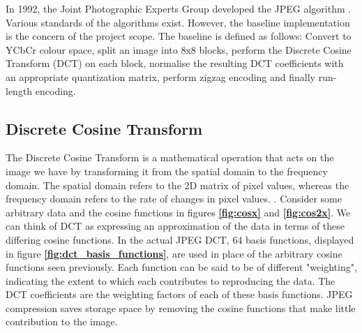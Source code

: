 \documentclass{l4proj}
\begin{document}
In 1992, the Joint Photographic Experts Group developed the JPEG algorithm \citep{lossy_data_compression:_jpeg_2021}. Various standards of the algorithms exist. However, the baseline implementation is the concern of the project scope. The baseline is defined as follows: Convert to YCbCr colour space, split an image into 8x8 blocks, perform the Discrete Cosine Transform (DCT) on each block, normalise the resulting DCT coefficients with an appropriate quantization matrix,  perform zigzag encoding and finally run-length encoding.

\subsection{Discrete Cosine Transform}

The Discrete Cosine Transform \citep{the_discrete_cosine_transform_(dct)_2021} is a mathematical operation that acts on the image we have by transforming it from the spatial domain to the frequency domain. The spatial domain refers to the 2D matrix of pixel values, whereas the frequency domain refers to the rate of changes in pixel values. \citep{spatial}. Consider some arbitrary data and the cosine functions in figures \textbf{\ref{fig:cosx}} and \textbf{\ref{fig:cos2x}}. We can think of DCT as expressing an approximation of the data in terms of these differing cosine functions. In the actual JPEG DCT, 64 basis functions, displayed in figure \textbf{\ref{fig:dct_basis_functions}}, are used in place of the arbitrary cosine functions seen previously. Each function can be said to be of different "weighting", indicating the extent to which each contributes to reproducing the data. The DCT coefficients are the weighting factors of each of these basis functions. JPEG compression saves storage space by removing the cosine functions that make little contribution to the image.
\end{document}
